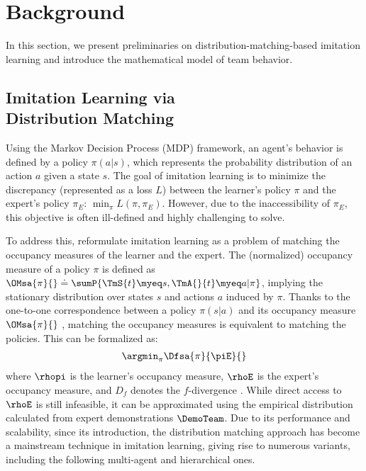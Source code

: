 \section{Background}
\label{sec. background}
In this section, we present preliminaries on distribution-matching-based imitation learning and introduce the mathematical model of team behavior.

\subsection{Imitation Learning via\\ Distribution Matching}
\label{sec. distribution matching}
Using the Markov Decision Process (MDP) framework, an agent's behavior is defined by a policy $\pi(a|s)$, which represents the probability distribution of an action $a$ given a state $s$. The goal of imitation learning is to minimize the discrepancy (represented as a loss $L$) between the learner's policy $\pi$ and the expert's policy $\pi_E$: $\min_{\pi} L(\pi, \pi_E)$. However, due to the inaccessibility of $\pi_E$, this objective is often ill-defined and highly challenging to solve.

To address this, \citet{ho2016generative} reformulate imitation learning as a problem of matching the occupancy measures of the learner and the expert. The (normalized) occupancy measure of a policy $\pi$ is defined as $\OMsa{\pi}{} \doteq \sumP{\TmS{t}\myeq s, \TmA{}{t}\myeq a|\pi}$, implying the stationary distribution over states $s$ and actions $a$ induced by $\pi$. Thanks to the one-to-one correspondence between a policy $\pi(s|a)$ and its occupancy measure $\OMsa{\pi}{}$ \cite{puterman2014markov}, matching the occupancy measures is equivalent to matching the policies. This can be formalized as:
\begin{align*}
    \argmin_{\pi}\Dfsa{\pi}{\piE}{} 
\end{align*}
where $\rhopi$ is the learner's occupancy measure, $\rhoE$ is the expert's occupancy measure, and $D_f$ denotes the $f$-divergence \cite{ghasemipour2020divergence}. While direct access to $\rhoE$ is still infeasible, it can be approximated using the empirical distribution calculated from expert demonstrations $\DemoTeam$. 
Due to its performance and scalability, since its introduction, the distribution matching approach has become a mainstream technique in imitation learning, giving rise to numerous variants, including the following multi-agent and hierarchical ones.

